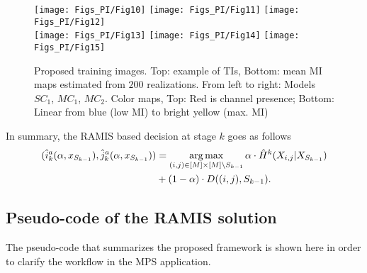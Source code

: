 \begin{figure}[!ht]
    \centering
    \texttt{[image: Figs\_PI/Fig10]}
    \texttt{[image: Figs\_PI/Fig11]}
    \texttt{[image: Figs\_PI/Fig12]}
		\\
    \texttt{[image: Figs\_PI/Fig13]}
    \texttt{[image: Figs\_PI/Fig14]}
    \texttt{[image: Figs\_PI/Fig15]}		
	\caption[Proposed training images.]{\label{fig:DB_TIs_PI} Proposed training images. Top: example of {TI}s, Bottom: mean MI maps estimated from $200$ realizations. From left to right: Models $SC_1$, $MC_1$, $MC_2$. Color maps, Top: Red is channel presence; Bottom: Linear from blue (low MI) to bright yellow (max. MI)}
\end{figure}

In summary, the RAMIS based decision at stage $k$ %
goes as follows
\begin{align}\label{eq_subsec_ObjectiveFunction_6_PI}
	(\hat{i}^a_k(\alpha, x_{S_{k-1}}), \hat{j}^a_k(\alpha, x_{S_{k-1}})) &= \operatorname*{arg\,max}_{(i,j)\in [M]\times [M] \setminus S_{k-1}} \alpha \cdot \hat{H}^{k}(X_{i,j}| X_{S_{k-1}} ) \nonumber\\ 
	&+ (1- \alpha) \cdot D(({i,j}),{S_{k-1}}). 
\end{align}
%

\subsection{Pseudo-code of the RAMIS solution}
\label{app_HeuAdSEMES_PI}

The pseudo-code that summarizes the proposed framework is shown here in order to clarify the workflow in the MPS application.\\

